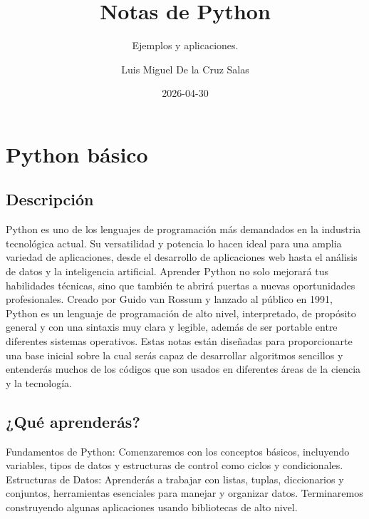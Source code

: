\documentclass[
  spanish,
  letterpaper,
]{scrbook}
\title{Notas de Python}
\subtitle{Ejemplos y aplicaciones.}
\author{Luis Miguel De la Cruz Salas}
\date{2026-04-30}
\renewcommand*\contentsname{Tabla de contenidos}
\newcommand\contentsname{Tabla de contenidos}
\theoremstyle{definition}
\theoremstyle{remark}
\begin{document}
\frontmatter
\maketitle

\renewcommand*\contentsname{Tabla de contenidos}
{
\setcounter{tocdepth}{2}
\tableofcontents
}

\mainmatter
{}

\chapter*{Python básico}\label{python-buxe1sico}


\section*{Descripción}\label{descripciuxf3n}


Python es uno de los lenguajes de programación más demandados en la
industria tecnológica actual. Su versatilidad y potencia lo hacen ideal
para una amplia variedad de aplicaciones, desde el desarrollo de
aplicaciones web hasta el análisis de datos y la inteligencia
artificial. Aprender Python no solo mejorará tus habilidades técnicas,
sino que también te abrirá puertas a nuevas oportunidades profesionales.
Creado por Guido van Rossum y lanzado al público en 1991, Python es un
lenguaje de programación de alto nivel, interpretado, de propósito
general y con una sintaxis muy clara y legible, además de ser portable
entre diferentes sistemas operativos. Estas notas están diseñadas para
proporcionarte una base inicial sobre la cual serás capaz de desarrollar
algoritmos sencillos y entenderás muchos de los códigos que son usados
en diferentes áreas de la ciencia y la tecnología.

\section*{¿Qué aprenderás?}\label{quuxe9-aprenderuxe1s}


Fundamentos de Python: Comenzaremos con los conceptos básicos,
incluyendo variables, tipos de datos y estructuras de control como
ciclos y condicionales. Estructuras de Datos: Aprenderás a trabajar con
listas, tuplas, diccionarios y conjuntos, herramientas esenciales para
manejar y organizar datos. Terminaremos construyendo algunas
aplicaciones usando bibliotecas de alto nivel.
\end{document}
